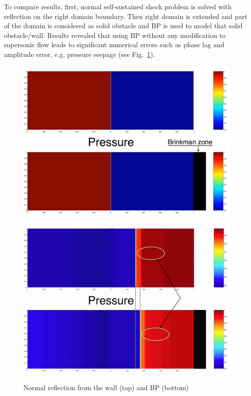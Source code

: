 To compare results, first, normal self-sustained shock problem is solved with reflection on the right domain boundary. Then right domain is extended and part of the domain is considered as solid obstacle and BP is used to model that solid obstacle/wall. Results revealed that using BP without any modification to supersonic flow leads to significant numerical errors such as phase lag and amplitude error, e.g. pressure seepage (see Fig.~\ref{fig:plain_bp}).
\begin{figure}[h!]
\begin{minipage}{0.49\linewidth}
\includegraphics[scale=0.2]{fig/sod1_init.png}\\
\end{minipage}
\hspace{0.02\linewidth}
\begin{minipage}{0.49\linewidth}
\includegraphics[scale=0.2]{fig/sod1_end.png}\\
\end{minipage}
\caption{Normal reflection from the wall (top) and BP (bottom)} \label{fig:plain_bp}
\end{figure}

